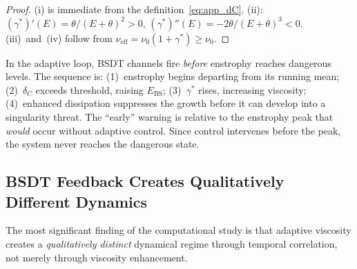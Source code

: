 \begin{proof}
(i) is immediate from the definition~\eqref{eq:app_dC}.
(ii): $(\gamma^*)'(E) = \theta/(E+\theta)^2 > 0$,
$(\gamma^*)''(E) = -2\theta/(E+\theta)^3 < 0$.
(iii)~and~(iv) follow from $\nu_{\mathrm{eff}} = \nu_0(1+\gamma^*)
\ge \nu_0$.
\end{proof}

\begin{remark}
In the adaptive loop, BSDT channels fire \emph{before}
enstrophy reaches dangerous levels.  The sequence is:
(1)~enstrophy begins departing from its running mean;
(2)~$\delta_C$ exceeds threshold, raising $E_{\mathrm{BS}}$;
(3)~$\gamma^*$ rises, increasing viscosity;
(4)~enhanced dissipation suppresses the growth before it can
develop into a singularity threat.
The ``early'' warning is relative to the enstrophy peak that
\emph{would} occur without adaptive control.  Since control
intervenes before the peak, the system never reaches the
dangerous state.
\end{remark}

\subsection{BSDT Feedback Creates Qualitatively Different Dynamics}
\label{app:ns:feedback_dynamics}

The most significant finding of the computational study is that
adaptive viscosity creates a \emph{qualitatively distinct}
dynamical regime through temporal correlation, not merely through
viscosity enhancement.

